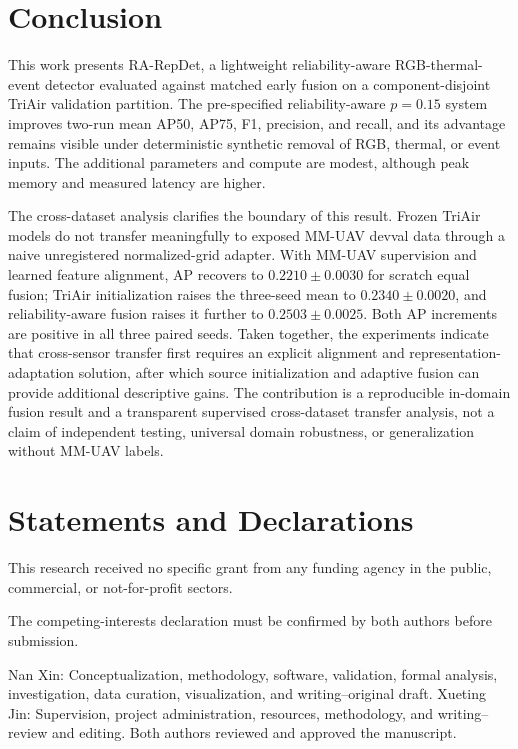 \section{Conclusion}
This work presents RA-RepDet, a lightweight reliability-aware RGB-thermal-event detector evaluated against matched early fusion on a component-disjoint TriAir validation partition. The pre-specified reliability-aware $p=0.15$ system improves two-run mean AP50, AP75, F1, precision, and recall, and its advantage remains visible under deterministic synthetic removal of RGB, thermal, or event inputs. The additional parameters and compute are modest, although peak memory and measured latency are higher.

The cross-dataset analysis clarifies the boundary of this result. Frozen TriAir models do not transfer meaningfully to exposed MM-UAV devval data through a naive unregistered normalized-grid adapter. With MM-UAV supervision and learned feature alignment, AP recovers to $0.2210\pm0.0030$ for scratch equal fusion; TriAir initialization raises the three-seed mean to $0.2340\pm0.0020$, and reliability-aware fusion raises it further to $0.2503\pm0.0025$. Both AP increments are positive in all three paired seeds. Taken together, the experiments indicate that cross-sensor transfer first requires an explicit alignment and representation-adaptation solution, after which source initialization and adaptive fusion can provide additional descriptive gains. The contribution is a reproducible in-domain fusion result and a transparent supervised cross-dataset transfer analysis, not a claim of independent testing, universal domain robustness, or generalization without MM-UAV labels.

\section*{Statements and Declarations}
This research received no specific grant from any funding agency in the public, commercial, or not-for-profit sectors.

The competing-interests declaration must be confirmed by both authors before submission.

Nan Xin: Conceptualization, methodology, software, validation, formal analysis, investigation, data curation, visualization, and writing--original draft. Xueting Jin: Supervision, project administration, resources, methodology, and writing--review and editing. Both authors reviewed and approved the manuscript.


